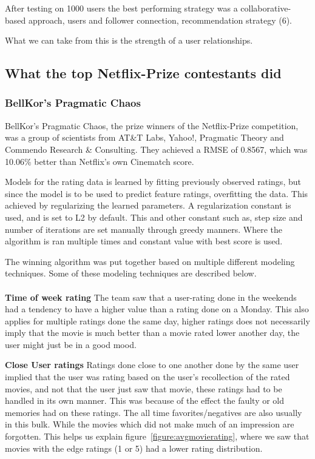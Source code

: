 After testing on 1000 users the best performing strategy was a collaborative-based approach, users and follower connection, recommendation strategy (6).

What we can take from this is the strength of a user relationships.


\subsection{What the top Netflix-Prize contestants did}\label{subsec:thewinners}
\subsubsection{BellKor's Pragmatic Chaos}
BellKor's Pragmatic Chaos, the prize winners of the Netflix-Prize competition, was a group of scientists from AT\&T Labs, Yahoo!, Pragmatic Theory and Commendo Research \& Consulting. They achieved a RMSE of 0.8567, which was 10.06\% better than Netflix's own Cinematch score.

Models for the rating data is learned by fitting previously observed ratings, but since the model is to be used to predict feature ratings, overfitting the data. This achieved by regularizing the learned parameters. A regularization constant is used, and is set to L2 by default. This and other constant such as, step size and number of iterations are set manually through greedy manners. Where the algorithm is ran multiple times and constant value with best score is used. \cite{BellKor-CF-TD}

The winning algorithm was put together based on multiple different modeling techniques. Some of these modeling techniques are described below. \\\\


\textbf{Time of week rating}  The team saw that a user-rating done in the weekends had a tendency to have a higher value than a rating done on a Monday. This also applies for multiple ratings done the same day, higher ratings does not necessarily imply that the movie is much better than a movie rated lower another day, the user might just be in a good mood.

\textbf{Close User ratings}  Ratings done close to one another done by the same user implied that the user was rating based on the user's recollection of the rated movies, and not that the user just saw that movie, these ratings had to be handled in its own manner. This was because of the effect the faulty or old memories had on these ratings. The all time favorites/negatives are also usually in this bulk. While the movies which did not make much of an impression are forgotten. This helps us explain figure~\ref{figure:avgmovierating}, where we saw that movies with the edge ratings (1 or 5) had a lower rating distribution.

